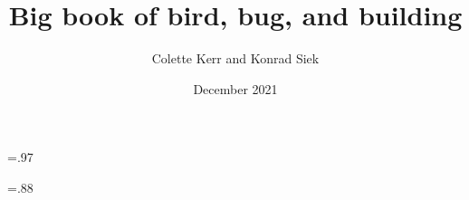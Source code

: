 \documentclass[a4paper,landscape,twoside]{memoir}
\begin{document}
\title{Big book of bird, bug, and building}
\author{Colette Kerr and Konrad Siek}
\date{December 2021}

\newlength{\verticalheight}
\verticalheight=.97\textheight

\newlength{\landscapeheight}
\landscapeheight=.88\textheight

\newcommand{\blankpage}{%
    \null
    \thispagestyle{empty}%
    \addtocounter{page}{-1}%
    \newpage}

\newcommand{\descriptioncolor}{white}
\pagecolor{black}

{\color{\descriptioncolor}
\maketitle
}

\newif\ifportrait

\newcommand{\portrait}[4][.5]{%
\noindent 
\begin{minipage}[t]{#1\linewidth}{\color{\descriptioncolor}
    \texttt{[image: \#2]}
}\end{minipage}
\begin{minipage}[t][\verticalheight]{.4\linewidth}
\vfill
\begin{minipage}[b][.5\verticalheight]{\linewidth}{\color{\descriptioncolor}
#3
}\end{minipage}
\begin{minipage}[b][.5\verticalheight]{\linewidth}{\color{\descriptioncolor}
#4
}\end{minipage} 
\end{minipage}
\hfill
\pagebreak
}

\newcommand{\landscape}[3]{%
\noindent
\begin{minipage}{.98\linewidth}
\texttt{[image: \#1]}
\end{minipage}
\\[\baselineskip]
\begin{minipage}[t]{\linewidth}
\begin{minipage}[t]{.4\linewidth}{\color{\descriptioncolor}
#2
}\end{minipage}
\hfill
\begin{minipage}[t]{.4\linewidth}{\color{\descriptioncolor}
#3
}\end{minipage}
\end{minipage}
\pagebreak
}
\end{document}
